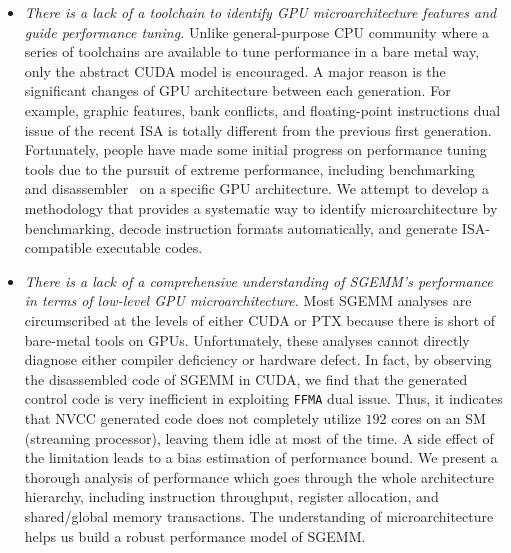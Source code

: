 \documentclass{sig-alternate-05-2015}
\begin{document}
\begin{itemize}
\item {\em There is a lack of a toolchain to identify GPU microarchitecture features and guide performance tuning.}
    Unlike general-purpose CPU community where a series of toolchains are available to tune performance in a bare metal
        way, only the abstract CUDA model is encouraged. A major reason is the significant changes of GPU architecture
        between each generation. For example, graphic features, bank conflicts, and floating-point instructions dual
        issue of the recent ISA is totally different from the previous first generation. Fortunately, people have made
        some initial progress on performance tuning tools due to the pursuit of extreme performance, including
        benchmarking~\cite{mei, volkov, wong} and disassembler~\cite{asfermi,bernstein2012usable,decuda,maxas} on a specific GPU architecture. We attempt to develop a methodology that provides a systematic way to identify microarchitecture by benchmarking, decode instruction formats automatically, and generate ISA-compatible executable codes.
\item {\em There is a lack of a comprehensive understanding of SGEMM's performance in terms of low-level GPU microarchitecture.} Most SGEMM analyses are circumscribed at the levels of either CUDA or PTX because there is short of bare-metal tools on GPUs. Unfortunately, these analyses cannot directly diagnose either compiler deficiency or hardware defect. In fact, by observing the disassembled code of SGEMM in CUDA, we find that the generated control code is very inefficient in exploiting {\tt FFMA} dual issue. Thus, it indicates that NVCC generated code does not completely utilize $192$ cores on an SM (streaming processor), leaving them idle at most of the time. A side effect of the limitation leads to a bias estimation of performance bound. We present a thorough analysis of performance which goes through the whole architecture hierarchy, including instruction throughput, register allocation, and shared/global memory transactions. The understanding of microarchitecture helps us build a robust performance model of SGEMM.
\end{itemize}
\end{document}
